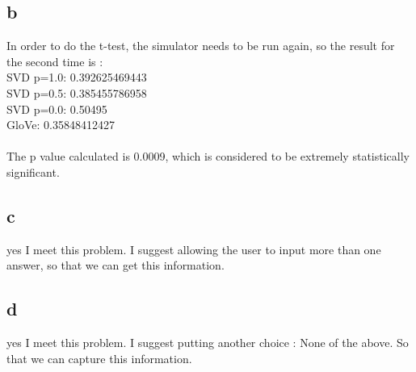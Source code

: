 \subsection{b}
In order to do the t-test, the simulator needs to be run again, so the result for the second time is :\\
SVD p=1.0: 0.392625469443 \\ 
SVD p=0.5: 0.385455786958 \\
SVD p=0.0: 0.50495	\\ 
GloVe:     0.35848412427 \\
\\
The p value calculated is 0.0009, which is considered to be extremely statistically significant. 

\subsection{c}
yes I meet this problem. I suggest allowing the user to input more than one answer, so that we can get this information.

\subsection{d}
yes I meet this problem. I suggest putting another choice : None of the above. So that we can capture this information.




